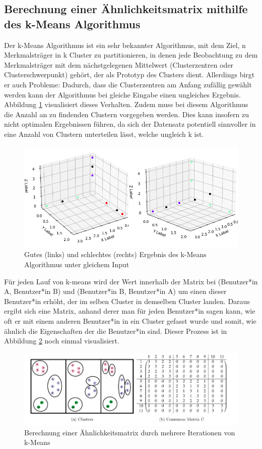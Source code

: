 \subsection{Berechnung einer Ähnlichkeitsmatrix mithilfe des k-Means Algorithmus}
Der k-Means Algorithmus ist ein sehr bekannter Algorithmus, mit dem Ziel, n Merkmalsträger in k Cluster zu partitionieren, in denen jede Beobachtung zu dem Merkmalsträger mit dem nächstgelegenen Mittelwert (Clusterzentren oder Clusterschwerpunkt) gehört, der als Prototyp des Clusters dient. Allerdings birgt er auch Probleme: Dadurch, dass die Clusterzentren am Anfang zufällig gewählt werden kann der Algorithmus bei gleiche Eingabe einen ungleiches Ergebnis. Abbildung \ref{fig:kmeans} visualisiert dieses Verhalten. Zudem muss bei diesem Algorithmus die Anzahl an zu findenden Clustern vorgegeben werden. Dies kann insofern zu nicht optimalen Ergebnissen führen, da sich der Datensatz potentiell sinnvoller in eine Anzahl von Clustern unterteilen lässt, welche ungleich k ist. 
\begin{figure}[h]
	\centering
	\includegraphics[width=\linewidth]{images/gutes_schlechtes_kmeans}
	\caption{Gutes (links) und schlechtes (rechts) Ergebnis des k-Means Algorithmus unter gleichem Input}
	\label{fig:kmeans}
\end{figure}
Für jeden Lauf von k-means wird der Wert innerhalb der Matrix bei (Benutzer*in A, Benutzer*in B) und (Benutzer*in B, Benutzer*in A) um einen dieser Benutzer*in erhöht, der im selben Cluster in demselben Cluster landen. Daraus ergibt sich eine Matrix, anhand derer man für jeden Benutzer*in sagen kann, wie oft er mit einem anderen Benutzer*in in ein Cluster gefasst wurde und somit, wie ähnlich die Eigenschaften der die Benutzer*in sind. Dieser Prozess ist in Abbildung \ref{fig:consensus_matrix}\cite{Godfrey.21.08.2014} noch einmal visualisiert.
\begin{figure}[h]
	\centering
	\includegraphics[width=\linewidth]{images/consensus_matrix}
	\caption{Berechnung einer Ähnlichkeitsmatrix durch mehrere Iterationen von k-Means}
	\label{fig:consensus_matrix}
\end{figure}

